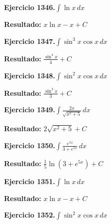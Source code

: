 \documentclass[10pt,a4paper]{article}
\begin{document}
\begin{ejbox}
\textbf{Ejercicio 1346.}\quad $\int \ln x\,dx$
\end{ejbox}

\begin{solbox}
\textbf{Resultado:} \(\displaystyle x\ln x - x + C\)
\end{solbox}

\begin{ejbox}
\textbf{Ejercicio 1347.}\quad $\int \sin^{3}x \cos x\,dx$
\end{ejbox}

\begin{solbox}
\textbf{Resultado:} \(\displaystyle \frac{\sin^{4}x}{4} + C\)
\end{solbox}

\newpage
\begin{ejbox}
\textbf{Ejercicio 1348.}\quad $\int \sin^{2}x \cos x\,dx$
\end{ejbox}

\begin{solbox}
\textbf{Resultado:} \(\displaystyle \frac{\sin^{3}x}{3} + C\)
\end{solbox}

\begin{ejbox}
\textbf{Ejercicio 1349.}\quad $\int \frac{2x}{\sqrt{x^2+5}}\,dx$
\end{ejbox}

\begin{solbox}
\textbf{Resultado:} \(\displaystyle 2\sqrt{x^2+5} + C\)
\end{solbox}

\begin{ejbox}
\textbf{Ejercicio 1350.}\quad $\int \frac{e^{5x}}{3+e^{5x}}\,dx$
\end{ejbox}

\begin{solbox}
\textbf{Resultado:} \(\displaystyle \frac{1}{5}\ln(3+e^{5x}) + C\)
\end{solbox}

\newpage
\begin{ejbox}
\textbf{Ejercicio 1351.}\quad $\int \ln x\,dx$
\end{ejbox}

\begin{solbox}
\textbf{Resultado:} \(\displaystyle x\ln x - x + C\)
\end{solbox}

\begin{ejbox}
\textbf{Ejercicio 1352.}\quad $\int \sin^{2}x \cos x\,dx$
\end{ejbox}
\end{document}
